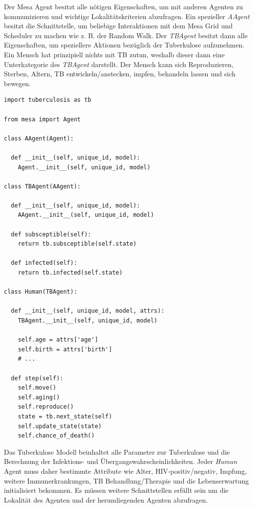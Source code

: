 \documentclass[paper=a4, fontsize=11pt, ngerman, abstract=on]{scrartcl}
\numberwithin{equation}{section} %
\numberwithin{figure}{section} %
\numberwithin{table}{section} %
\begin{document}
Der Mesa Agent besitzt alle nötigen Eigenschaften, um mit anderen Agenten zu kommunizieren und wichtige Lokalitätskriterien abzufragen. Ein spezieller \textit{AAgent} besitzt die Schnittstelle, um beliebige Interaktionen mit dem Mesa Grid und Scheduler zu machen wie z. B. der Random Walk. Der \textit{TBAgent} besitzt dann alle Eigenschaften, um speziellere Aktionen bezüglich der Tuberkulose aufzunehmen. Ein Mensch hat prinzipiell nichts mit TB zutun, weshalb dieser dann eine Unterkategorie des \textit{TBAgent} darstellt. Der Mensch kann sich Reproduzieren, Sterben, Altern, TB entwickeln/anstecken, impfen, behandeln lassen und sich bewegen.

\begin{lstlisting}[style=python]
import tuberculosis as tb

from mesa import Agent

class AAgent(Agent):

  def __init__(self, unique_id, model):
    Agent.__init__(self, unique_id, model)

class TBAgent(AAgent):

  def __init__(self, unique_id, model):
    AAgent.__init__(self, unique_id, model)

  def subsceptible(self):
    return tb.subsceptible(self.state)

  def infected(self):
    return tb.infected(self.state)

class Human(TBAgent):

  def __init__(self, unique_id, model, attrs):
    TBAgent.__init__(self, unique_id, model)

    self.age = attrs['age']
    self.birth = attrs['birth']
    # ...

  def step(self):
    self.move()
    self.aging()
    self.reproduce()
    state = tb.next_state(self)
    self.update_state(state)
    self.chance_of_death()
\end{lstlisting}

Das Tuberkulose Modell beinhaltet alle Parameter zur Tuberkulose und die Berechnung der Infektions- und Übergangswahrscheinlichkeiten. Jeder \textit{Human} Agent muss daher bestimmte Attribute wie Alter, HIV-positiv/negativ, Impfung, weitere Immunerkrankungen, TB Behandlung/Therapie und die Lebenserwartung initialisiert bekommen. Es müssen weitere Schnittstellen erfüllt sein um die Lokalität des Agenten und der herumliegenden Agenten abzufragen.
\end{document}
